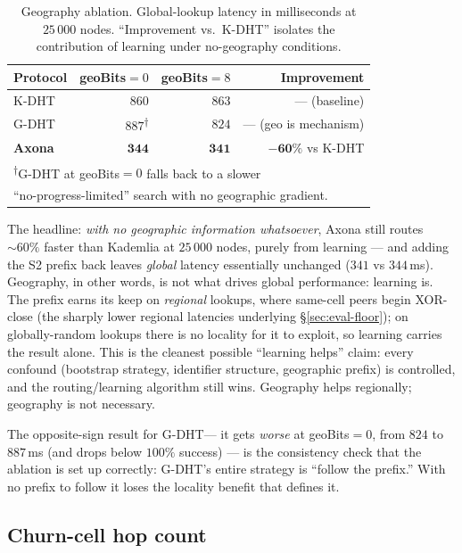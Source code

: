 \documentclass[conference]{IEEEtran}
\newcommand{\axona}{Axona\xspace}
\newcommand{\KDHT}{K-DHT\xspace}
\newcommand{\GDHT}{G-DHT\xspace}
\begin{document}
\begin{table}[t]
\centering
\caption{Geography ablation.  Global-lookup latency in
milliseconds at $25\,000$ nodes.  ``Improvement vs.\ \KDHT''
isolates the contribution of learning under no-geography
conditions.}
\label{tab:geo}
\small
\setlength{\tabcolsep}{4pt}
\begin{tabular}{@{}lrrr@{}}
\toprule
\textbf{Protocol} & \textbf{geoBits$=0$} & \textbf{geoBits$=8$} &
\textbf{Improvement} \\
\midrule
\KDHT & $860$ & $863$ & --- (baseline) \\
\GDHT & $887$\textsuperscript{$\dagger$} & $824$ & --- (geo is mechanism) \\
\textbf{\axona} & $\mathbf{344}$ & $\mathbf{341}$ &
$\mathbf{-60\%}$ vs \KDHT \\
\bottomrule
\multicolumn{4}{l}{\footnotesize\textsuperscript{$\dagger$}\GDHT at
geoBits$=0$ falls back to a slower} \\
\multicolumn{4}{l}{\footnotesize ``no-progress-limited'' search with no
geographic gradient.}
\end{tabular}
\end{table}

The headline: \emph{with no geographic information whatsoever},
\axona still routes $\sim\!60\%$ faster than Kademlia at
$25\,000$ nodes, purely from learning --- and adding the S2
prefix back leaves \emph{global} latency essentially unchanged
($341$ vs $344$\,ms).  Geography, in other words, is not what
drives global performance: learning is.  The prefix earns its
keep on \emph{regional} lookups, where same-cell peers begin
XOR-close (the sharply lower regional latencies underlying
\S\ref{sec:eval-floor}); on globally-random lookups there is no
locality for it to exploit, so learning carries the result
alone.  This is the cleanest possible ``learning helps'' claim:
every confound (bootstrap strategy, identifier structure,
geographic prefix) is controlled, and the routing/learning
algorithm still wins.  Geography helps regionally; geography is
not necessary.

The opposite-sign result for \GDHT --- it gets \emph{worse} at
geoBits$=0$, from $824$ to $887$\,ms (and drops below $100\%$
success) --- is the consistency check that the ablation is set
up correctly: \GDHT's entire strategy is ``follow the prefix.''
With no prefix to follow it loses the locality benefit that
defines it.

\subsection{Churn-cell hop count}
\label{sec:eval-churn}
\end{document}
